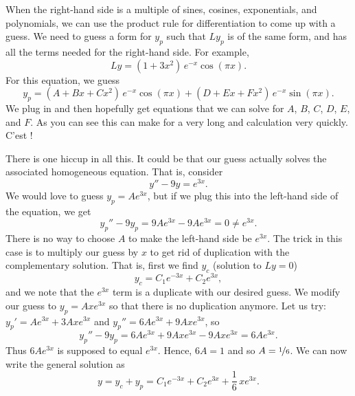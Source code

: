When the right-hand side is a multiple of sines, cosines, exponentials,
and polynomials, we can use the product rule
for differentiation to come up with a guess.  We
need to guess a
form for $y_p$ such that $Ly_p$ is of the same form, and 
has all the terms needed for 
the right-hand side.
For example,
\begin{equation*}
Ly = (1+3x^2)\,e^{-x}\cos (\pi x) .
\end{equation*}
For this equation, we guess
\begin{equation*}
y_p = (A + Bx + Cx^2)\,e^{-x} \cos (\pi x) + 
(D + Ex + Fx^2)\,e^{-x} \sin (\pi x) .
\end{equation*}
We plug in and then hopefully get equations that we can solve for
$A$, $B$, $C$, $D$, $E$, and $F$.
As you can see this can make for a very long and
calculation very quickly.  C'est ! %

\medskip

There is one hiccup in all this.  It could be that our guess actually
solves the associated homogeneous equation.  That is, consider
\begin{equation*}
y'' - 9y = e^{3x} .
\end{equation*}
We would love to guess $y_p = Ae^{3x}$, but if we plug this into the
left-hand side of the equation, we get
\begin{equation*}
y_p''-9y_p = 9Ae^{3x} - 9Ae^{3x} = 0 \not= e^{3x} .
\end{equation*}
There is no way to choose $A$ to make the left-hand side be $e^{3x}$.
The trick in
this case
is to multiply our guess by $x$ to get rid of duplication with the
complementary solution.  That is, first we find $y_c$ (solution to $Ly =
0$)
\begin{equation*}
y_c = C_1 e^{-3x} + C_2 e^{3x} ,
\end{equation*}
and we note that the $e^{3x}$ term is a duplicate with our desired guess.
We modify our guess to $y_p = Axe^{3x}$ so that there is no
duplication anymore.  Let us try:
$y_p' = Ae^{3x} + 3Axe^{3x}$ and 
$y_p'' = 6Ae^{3x} + 9Axe^{3x}$, so
\begin{equation*}
y_p'' -9y_p = 6Ae^{3x} + 9Axe^{3x} - 9Axe^{3x} = 
6Ae^{3x} .
\end{equation*}
Thus $6Ae^{3x}$ is supposed to equal $e^{3x}$.  Hence,
$6A = 1$ and so $A=\nicefrac{1}{6}$.  We can now write the general
solution as
\begin{equation*}
y = y_c + y_p = 
C_1 e^{-3x} + C_2 e^{3x} + \frac{1}{6}\,xe^{3x} .
\end{equation*}

